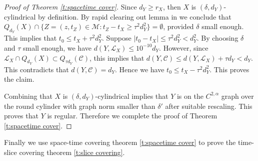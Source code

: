 \documentclass[11pt,reqno]{amsart}
\numberwithin{equation}{section}
\newcommand{\cC}{\mathcal{C}}
\newcommand{\cL}{\mathcal{L}}
\newcommand{\cM}{\mathcal{M}}
\theoremstyle{definition}
\theoremstyle{remark}
\theoremstyle{remark}
\theoremstyle{remark}
\theoremstyle{remark}\newtheorem{conjecture}[equation]{Conjecture}
\theoremstyle{remark}\newtheorem{question}[equation]{Question}
\begin{document}
\begin{proof}[Proof of Theorem \ref{t:spacetime cover}]
Since $d_Y \ge r_X$, then $X$ is $(\delta, d_Y)$-cylindrical by definition. By rapid clearing out lemma in \cite{CM16} we conclude that $Q_{d_Y}(X) \cap \{Z=(z,t_Z) \in \cM: t_Z-t_X \ge \tau^2 d_Y^2\}  = \emptyset$, provided $\delta$ small enough. This implies that $t_0 \le t_X + \tau^2 d_Y^2$. Suppose $|t_0 - t_X| \le \tau^2 d_Y^2<d_Y^2$. By choosing $\delta$ and $\tau$ small enough, we have $d(Y, \cL_X) \le 10^{-10}d_Y$. However, since $\cL_X \cap Q_{d_Y}(X) \subset Q_{\tau d_Y}(\cC)$, this implies that $d(Y,\cC) \le d(Y,\cL_X) + \tau d_Y < d_Y$. This contradicts that $ d(Y,\cC) = d_Y$. Hence we have $t_0 \le t_X - \tau^2 d_Y^2$. This proves the claim. 

Combining that $X$ is $(\delta,d_Y)$-cylindrical implies that $Y$ is on the $C^{2,\alpha}$ graph over the round cylinder with graph norm smaller than $\delta'$ after suitable rescaling. This proves that $Y$ is regular. Therefore we complete the proof of Theorem \ref{t:spacetime cover}.
\end{proof}



Finally we use space-time covering theorem \ref{t:spacetime cover} to prove the time-slice covering theorem \ref{t:slice covering}.
\end{document}
